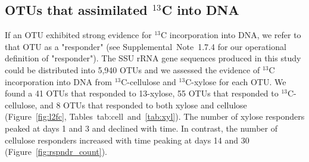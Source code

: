 \subsection{OTUs that assimilated $^{13}$C into DNA} \label{responders}
If an OTU exhibited strong evidence for $^{13}$C incorporation into DNA, we
refer to that OTU as a "responder" (see Supplemental Note 1.7.4 for our
operational definition of "responder"). The SSU rRNA gene sequences produced in
this study could be distributed into 5,940 OTUs and we assessed the evidence of
$^{13}$C incorporation into DNA from $^{13}$C-cellulose and $^{13}$C-xylose for
each OTU. We found a 41 OTUs that responded to 13-xylose, 55 OTUs that
responded to $^{13}$C-cellulose, and 8 OTUs that responded to both xylose and
cellulose (Figure~\ref{fig:l2fc}, Tables~{tab:cell}~and~\ref{tab:xyl}). The
number of xylose responders peaked at days 1 and 3 and declined with time. In
contrast, the number of cellulose responders increased with time peaking at
days 14 and 30 (Figure~\ref{fig:rspndr_count}). 

